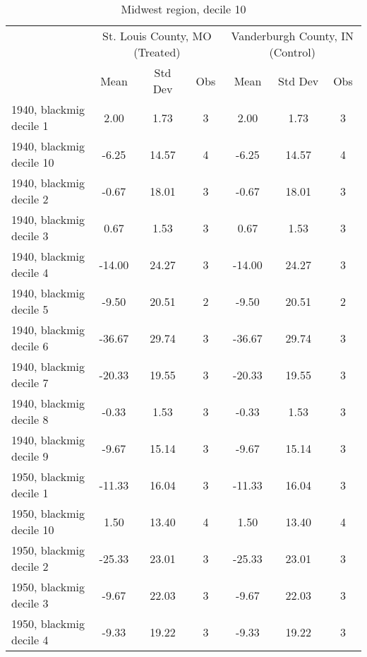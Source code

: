 \begin{table}[htbp]\centering
\def\sym#1{\ifmmode^{#1}\else\(^{#1}\)\fi}
\caption{Midwest region, decile 10 \label{tab1}}
\begin{tabular}{l*{2}{ccc}}
\toprule
                    &\multicolumn{3}{c}{St. Louis County, MO (Treated)}&\multicolumn{3}{c}{Vanderburgh County, IN (Control)}\\
                    &        Mean&     Std Dev&         Obs&        Mean&     Std Dev&         Obs\\
\midrule
1940, blackmig decile 1&        2.00&        1.73&           3&        2.00&        1.73&           3\\
1940, blackmig decile 10&       -6.25&       14.57&           4&       -6.25&       14.57&           4\\
1940, blackmig decile 2&       -0.67&       18.01&           3&       -0.67&       18.01&           3\\
1940, blackmig decile 3&        0.67&        1.53&           3&        0.67&        1.53&           3\\
1940, blackmig decile 4&      -14.00&       24.27&           3&      -14.00&       24.27&           3\\
1940, blackmig decile 5&       -9.50&       20.51&           2&       -9.50&       20.51&           2\\
1940, blackmig decile 6&      -36.67&       29.74&           3&      -36.67&       29.74&           3\\
1940, blackmig decile 7&      -20.33&       19.55&           3&      -20.33&       19.55&           3\\
1940, blackmig decile 8&       -0.33&        1.53&           3&       -0.33&        1.53&           3\\
1940, blackmig decile 9&       -9.67&       15.14&           3&       -9.67&       15.14&           3\\
1950, blackmig decile 1&      -11.33&       16.04&           3&      -11.33&       16.04&           3\\
1950, blackmig decile 10&        1.50&       13.40&           4&        1.50&       13.40&           4\\
1950, blackmig decile 2&      -25.33&       23.01&           3&      -25.33&       23.01&           3\\
1950, blackmig decile 3&       -9.67&       22.03&           3&       -9.67&       22.03&           3\\
1950, blackmig decile 4&       -9.33&       19.22&           3&       -9.33&       19.22&           3\\

\end{tabular}
\end{table}
